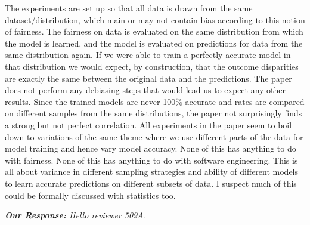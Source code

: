 \documentclass[conference,review,anonymous]{IEEEtran}
\newcommand{\highlight}[1]{\begin{framed}%
  \noindent\emph{#1}
\end{framed}}
\begin{document}
The experiments are set up so that all data is drawn from the same
dataset/distribution, which main or may not contain bias according to
this notion of fairness. The fairness on data is evaluated on the same
distribution from which the model is learned, and the model is
evaluated on predictions for data from the same distribution again. If
we were able to train a perfectly accurate model in that distribution
we would expect, by construction, that the outcome disparities are
exactly the same between the original data and the predictions. The
paper does not perform any debiasing steps that would lead us to
expect any other results. Since the trained models are never 100\%
accurate and rates are compared on different samples from the same
distributions, the paper not surprisingly finds a strong but not
perfect correlation. All experiments in the paper seem to boil down to
variations of the same theme where we use different parts of the data
for model training and hence vary model accuracy. None of this has
anything to do with fairness. None of this has anything to do with
software engineering. This is all about variance in different sampling
strategies and ability of different models to learn accurate
predictions on different subsets of data. I suspect much of this could
be formally discussed with statistics too.

\highlight{\emph{\textbf{Our Response:}} Hello reviewer 509A.}
\end{document}

